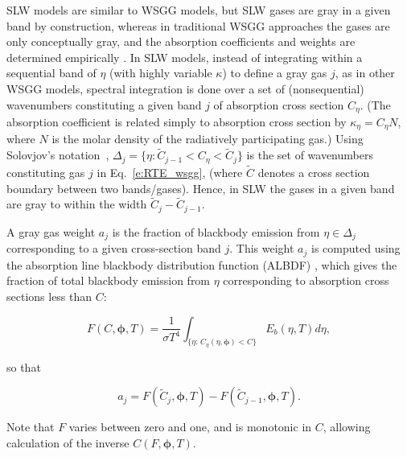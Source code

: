\documentclass[preprint,12pt, a4paper]{elsarticle}
\newcommand{\BS}{\boldsymbol}
\begin{document}
SLW models are similar to WSGG models, but SLW gases are gray in a given band by construction, whereas in traditional WSGG approaches the gases are only conceptually gray, and the absorption coefficients and weights are determined empirically \cite{Badger_2019}. 
%
In SLW models, instead of integrating within a sequential band of $\eta$ (with highly variable $\kappa$) to define a gray gas $j$, as in other WSGG models, spectral integration is done over a set of (nonsequential) wavenumbers constituting a given band $j$ of absorption cross section $C_\eta$.
%
(The absorption coefficient is related simply to absorption cross section by $\kappa_\eta=C_\eta N$, where $N$ is the molar density of the radiatively participating gas.)
%
Using Solovjov's notation~\cite{Solovjov_2017}, $\Delta_j=\{\eta:\tilde{C}_{j-1}<C_\eta<\tilde{C}_j\}$ is the set of wavenumbers constituting gas $j$ in Eq.~\ref{e:RTE_wsgg}, (where $\tilde{C}$ denotes a cross section boundary between two bands/gases).
%
Hence, in SLW the gases in a given band are gray to within the width $\tilde{C}_j-\tilde{C}_{j-1}$.








A gray gas weight $a_j$ is the fraction of blackbody emission from $\eta\in\Delta_j$ corresponding to a given cross-section band $j$. This weight $a_j$ is computed using the absorption line blackbody distribution function (ALBDF) \cite{Pearson_2014}, which gives the fraction of total blackbody emission from $\eta$ corresponding to absorption cross sections less than $C$: 
%
\begin{linenomath}
    \begin{equation} \label{e:albdf}
        F(C,\BS{\phi},T) = \frac{1}{\sigma T^4}\int_{\{\eta:\,C_\eta(\eta,\BS{\phi})<C\}}E_b(\eta,T)d\eta,
\end{equation}
\end{linenomath}
%
so that
%
\begin{linenomath}
    \begin{equation}\label{e:aj}
    a_j = F(\tilde{C}_j,\BS{\phi}, T) - F(\tilde{C}_{j-1}, \BS{\phi},T).
\end{equation}
\end{linenomath}
%
Note that $F$ varies between zero and one, and is monotonic in $C$, allowing calculation of the inverse $C(F,\BS{\phi},T)$.
\end{document}
